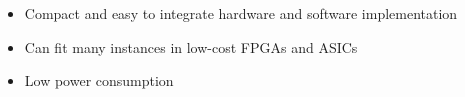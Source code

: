 \begin{itemize}
  \itemsep-0.5em
\item Compact and easy to integrate hardware and software implementation
\item Can fit many instances in low-cost FPGAs and ASICs
\item Low power consumption
\end{itemize}
